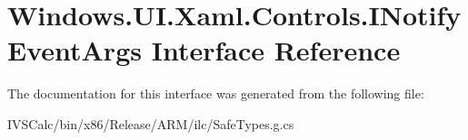 \hypertarget{interface_windows_1_1_u_i_1_1_xaml_1_1_controls_1_1_i_notify_event_args}{}\section{Windows.\+U\+I.\+Xaml.\+Controls.\+I\+Notify\+Event\+Args Interface Reference}
\label{interface_windows_1_1_u_i_1_1_xaml_1_1_controls_1_1_i_notify_event_args}


The documentation for this interface was generated from the following file\+:\begin{DoxyCompactItemize}
\item 
I\+V\+S\+Calc/bin/x86/\+Release/\+A\+R\+M/ilc/Safe\+Types.\+g.\+cs\end{DoxyCompactItemize}
